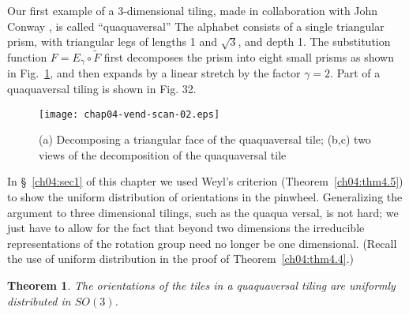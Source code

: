 \documentclass[reqno]{stml-l}
\theoremstyle{plain}
\newtheorem{theorem}{Theorem}[chapter]
\theoremstyle{definition}
\numberwithin{equation}{chapter}
\begin{document}
Our first example of a 3-dimensional tiling, made in collaboration with John Conway \cite{bib:CoR}, is called ``quaquaversal'' The alphabet consists of a single triangular prism, with triangular legs of lengths 1 and $\sqrt{3}$, and depth 1. The substitution function $F=E_{\gamma}\circ\tilde{F}$ first decomposes the prism into eight small prisms as shown in Fig.~\ref{ch04:fig31},
and then expands by a linear stretch by the factor $\gamma=2$. Part of a quaquaversal tiling is shown in Fig. 32.
\begin{figure}[!h]
\texttt{[image: chap04-vend-scan-02.eps]}
\caption{(a) Decomposing a triangular face of the quaquaversal tile;
(b,c) two views of the decomposition of the quaquaversal
tile}\label{ch04:fig31}
\end{figure}

In \S~\ref{ch04:sec1} of this chapter we used Weyl's criterion (Theorem~\ref{ch04:thm4.5}) to show the uniform distribution of orientations in the pinwheel. Generalizing the argument to three dimensional tilings, such as the quaqua versal, is not hard; we just have to allow for the fact that beyond two dimensions the irreducible representations of the rotation group need no longer be one dimensional. (Recall the use of uniform distribution in the proof of Theorem~\ref{ch04:thm4.4}.)

\begin{theorem}\label{ch04:thm4.6}
The orientations of the tiles in a quaquaversal tiling are uniformly distributed in $SO(3)$.
\end{theorem}
\end{document}

